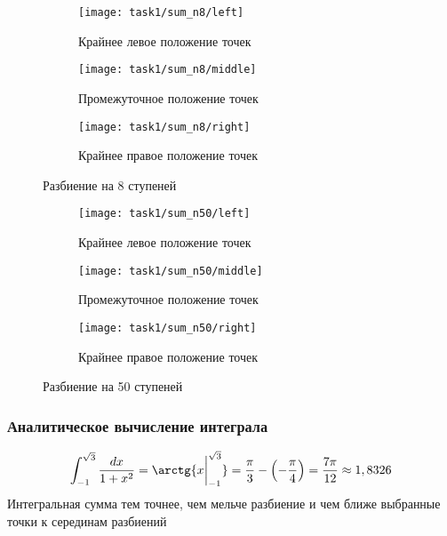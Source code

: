 \begin{figure}[H]
	\centering
	\begin{subfigure}{0.3\textwidth}
		\centering
		\texttt{[image: task1/sum\_n8/left]}\quad
		\caption*{Крайнее левое положение точек}
	\end{subfigure}
	\begin{subfigure}{0.3\textwidth}
		\centering
		\texttt{[image: task1/sum\_n8/middle]}\quad
		\caption*{Промежуточное положение точек}
	\end{subfigure}
	\begin{subfigure}{0.3\textwidth}
		\centering
		\texttt{[image: task1/sum\_n8/right]}\quad
		\caption*{Крайнее правое положение точек}
	\end{subfigure}
	\caption{Разбиение на 8 ступеней}
\end{figure}

\begin{figure}[H]
	\centering
	\begin{subfigure}{0.3\textwidth}
		\centering
		\texttt{[image: task1/sum\_n50/left]}\quad
		\caption*{Крайнее левое положение точек}
	\end{subfigure}
	\begin{subfigure}{0.3\textwidth}
		\centering
		\texttt{[image: task1/sum\_n50/middle]}\quad
		\caption*{Промежуточное положение точек}
	\end{subfigure}
	\begin{subfigure}{0.3\textwidth}
		\centering
		\texttt{[image: task1/sum\_n50/right]}\quad
		\caption*{Крайнее правое положение точек}
	\end{subfigure}
	\caption{Разбиение на 50 ступеней}
\end{figure}
\subsubsection*{Аналитическое вычисление интеграла}
\begin{equation*}
	\int_{-1}^{\sqrt{3}}\frac{dx}{1+x^2}=\arctg{x\bigg|_{-1}^{\sqrt{3}}}=\frac{\pi }{3}-\left(-\frac{\pi }{4}\right)=\frac{7\pi}{12}\approx1,8326
\end{equation*}
Интегральная сумма тем точнее, чем мельче разбиение и чем ближе выбранные точки к серединам разбиений
